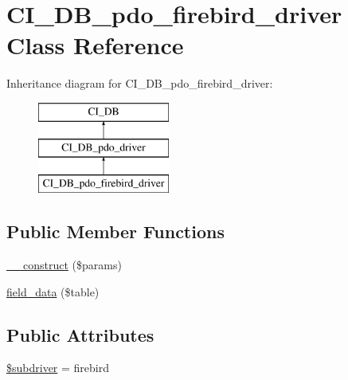 \hypertarget{class_c_i___d_b__pdo__firebird__driver}{}\section{C\+I\+\_\+\+D\+B\+\_\+pdo\+\_\+firebird\+\_\+driver Class Reference}
\label{class_c_i___d_b__pdo__firebird__driver}
Inheritance diagram for C\+I\+\_\+\+D\+B\+\_\+pdo\+\_\+firebird\+\_\+driver\+:\begin{figure}[H]
\begin{center}
\leavevmode
\includegraphics[height=3.000000cm]{class_c_i___d_b__pdo__firebird__driver}
\end{center}
\end{figure}
\subsection*{Public Member Functions}
\begin{DoxyCompactItemize}
\item 
\mbox{\hyperlink{class_c_i___d_b__pdo__firebird__driver_a9162320adff1a1a4afd7f2372f753a3e}{\+\_\+\+\_\+construct}} (\$params)
\item 
\mbox{\hyperlink{class_c_i___d_b__pdo__firebird__driver_a90355121e1ed009e0efdbd544ab56efa}{field\+\_\+data}} (\$table)
\end{DoxyCompactItemize}
\subsection*{Public Attributes}
\begin{DoxyCompactItemize}
\item 
\mbox{\hyperlink{class_c_i___d_b__pdo__firebird__driver_a1322ca756348b11d080cb7a4f590de15}{\$subdriver}} = \textquotesingle{}firebird\textquotesingle{}
\end{DoxyCompactItemize}
